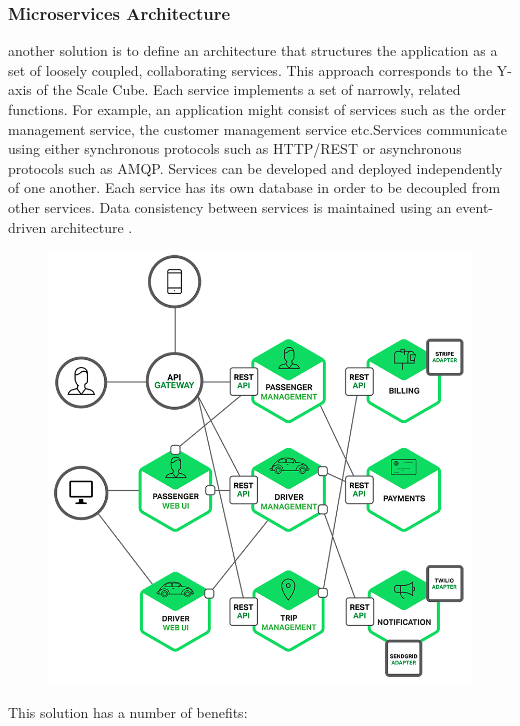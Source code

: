 \subsubsection{Microservices Architecture}
\label{subsec:subsec01}
another solution is to define an architecture that structures the application as a set of loosely coupled, collaborating services. 
This approach corresponds to the Y-axis of the Scale Cube. Each service implements a set of narrowly, related functions. For example, an application might 
consist of services such as the order management service, the customer management service etc.Services communicate using either synchronous protocols such 
as HTTP/REST or asynchronous protocols such as AMQP. Services can be developed and deployed independently of one another. 
Each service has its own database in order to be decoupled from other services. Data consistency between services is maintained using 
an event-driven architecture .
\begin{figure}[h!]
	\centering
	\includegraphics[height=0.4\textheight]{fig01/microservices}
	\label{fig:FilialesEtClients}
\end{figure}

This solution has a number of benefits:

